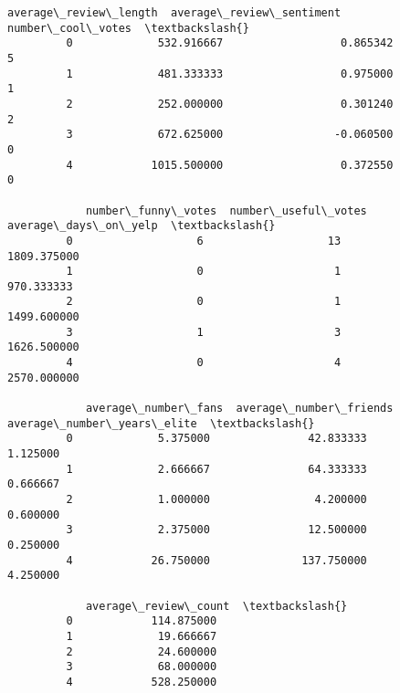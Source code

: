 \documentclass[11pt]{article}
\begin{document}
\begin{Verbatim}[commandchars=\\\{\}]
            average\_review\_length  average\_review\_sentiment  number\_cool\_votes  \textbackslash{}
         0             532.916667                  0.865342                  5   
         1             481.333333                  0.975000                  1   
         2             252.000000                  0.301240                  2   
         3             672.625000                 -0.060500                  0   
         4            1015.500000                  0.372550                  0   
         
            number\_funny\_votes  number\_useful\_votes  average\_days\_on\_yelp  \textbackslash{}
         0                   6                   13           1809.375000   
         1                   0                    1            970.333333   
         2                   0                    1           1499.600000   
         3                   1                    3           1626.500000   
         4                   0                    4           2570.000000   
         
            average\_number\_fans  average\_number\_friends  average\_number\_years\_elite  \textbackslash{}
         0             5.375000               42.833333                    1.125000   
         1             2.666667               64.333333                    0.666667   
         2             1.000000                4.200000                    0.600000   
         3             2.375000               12.500000                    0.250000   
         4            26.750000              137.750000                    4.250000   
         
            average\_review\_count  \textbackslash{}
         0            114.875000   
         1             19.666667   
         2             24.600000   
         3             68.000000   
         4            528.250000   
         

\end{Verbatim}
\end{document}
